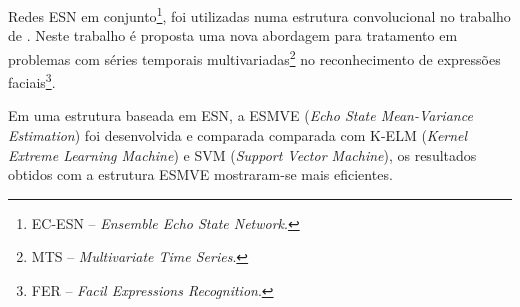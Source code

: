 

Redes ESN em conjunto\footnote{EC-ESN -- \textit{Ensemble Echo State Network}.}, foi utilizadas numa estrutura convolucional no trabalho de . Neste trabalho é proposta uma nova abordagem para tratamento em problemas com séries temporais multivariadas\footnote{MTS -- \textit{Multivariate Time Series}.} no reconhecimento de expressões faciais\footnote{FER -- \textit{Facil Expressions Recognition}.}. %

Em  uma estrutura baseada em ESN, a ESMVE (\textit{Echo State Mean-Variance Estimation}) foi desenvolvida e comparada comparada com K-ELM (\textit{Kernel Extreme Learning Machine}) e SVM (\textit{Support Vector Machine}), os resultados obtidos com a estrutura ESMVE mostraram-se mais eficientes.%

